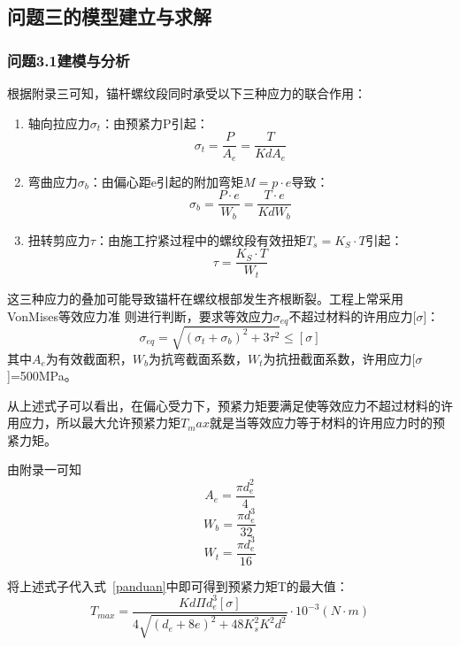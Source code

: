 \documentclass[UTF-8,a4paper,zihao=-4]{ctexart}
\begin{document}
\subsection{问题三的模型建立与求解}

\subsubsection{问题3.1建模与分析}
根据附录三可知，锚杆螺纹段同时承受以下三种应力的联合作用：
\begin{enumerate}
    \item 轴向拉应力$\sigma_t$：由预紧力P引起：
    \begin{equation}
        \sigma_t=\frac{P}{A_e}=\frac{T}{KdA_e}
    \end{equation}
    \item 弯曲应力$\sigma_b$：由偏心距e引起的附加弯矩$M=p\cdot e$导致：
    \begin{equation}
        \sigma_b=\frac{P\cdot e}{W_b}=\frac{T\cdot e}{KdW_b}
    \end{equation}
    \item 扭转剪应力$\tau$：由施工拧紧过程中的螺纹段有效扭矩$T_s=K_S\cdot T$引起：
    \begin{equation}
        \tau=\frac{K_S\cdot T}{W_t}
    \end{equation}
\end{enumerate}
这三种应力的叠加可能导致锚杆在螺纹根部发生齐根断裂。工程上常采用VonMises等效应力准
则进行判断，要求等效应力$\sigma_{eq}$不超过材料的许用应力[$\sigma$]：
\begin{equation}
    \sigma_{eq}=\sqrt{(\sigma_t+\sigma_b)^2+3\tau^2}\le [\sigma]
    \label{panduan}
\end{equation}
其中$A_e$为有效截面积，$W_b$为抗弯截面系数，$W_t$为抗扭截面系数，许用应力[$\sigma$]=500MPa。

从上述式子可以看出，在偏心受力下，预紧力矩要满足使等效应力不超过材料的许用应力，所以最大允许预紧力矩$T_max$就是当等效应力等于材料的许用应力时的预紧力矩。

由附录一可知
\begin{equation}
    A_e=\frac{\pi d_e^2}{4}
\end{equation}
\begin{equation}
    W_b=\frac{\pi d_e^3}{32}
\end{equation}
\begin{equation}
    W_t=\frac{\pi d_e^3}{16}
\end{equation}

将上述式子代入式~\ref{panduan}中即可得到预紧力矩T的最大值：
\begin{equation}
    T_{max}=\frac{Kd\Pi d_e^3[\sigma]}{4\sqrt{(d_e+8e)^2+48K_s^2K^2d^2}} \cdot 10^{-3}(N\cdot m)
\label{q4-lim4-raw}
\end{equation}
\end{document}
